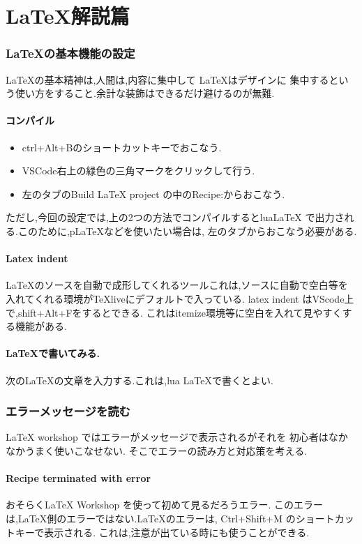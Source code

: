 \documentclass{ltjsarticle}
\begin{document}
\part{\LaTeX 解説篇}
\section{\LaTeX の基本機能の設定}
\LaTeX の基本精神は,人間は,内容に集中して \LaTeX はデザインに
集中するという使い方をすること.余計な装飾はできるだけ避けるのが無難.
\subsection{コンパイル}
\begin{itemize}
  \item ctrl+Alt+Bのショートカットキーでおこなう.
  \item VSCode右上の緑色の三角マークをクリックして行う.
  \item 左のタブのBuild LaTeX project の中のRecipe:からおこなう.
\end{itemize}
ただし,今回の設定では,上の2つの方法でコンパイルするとlua\LaTeX
で出力される.このために,pLaTeXなどを使いたい場合は,
左のタブからおこなう必要がある.
\subsection{Latex indent}
LaTeXのソースを自動で成形してくれるツールこれは,ソースに自動で空白等を
入れてくれる環境がTeXliveにデフォルトで入っている.
latex indent はVScode上で,shift+Alt+Fをするとできる.
これはitemize環境等に空白を入れて見やすくする機能がある.
\subsection{\LaTeX で書いてみる.}
次の\LaTeX の文章を入力する.これは,lua \LaTeX で書くとよい.


\section{エラーメッセージを読む}
LaTeX workshop ではエラーがメッセージで表示されるがそれを
初心者はなかなかうまく使いこなせない.
そこでエラーの読み方と対応策を考える.
\subsection{Recipe terminated with error}
おそらくLaTeX Workshop を使って初めて見るだろうエラー.
このエラーは,LaTeX側のエラーではない.LaTeXのエラーは,
Ctrl+Shift+M のショートカットキーで表示される.
これは,注意が出ている時にも使うことができる.
\end{document}
